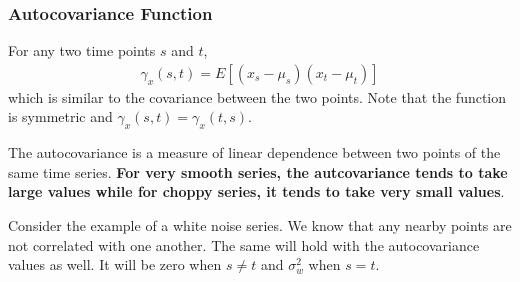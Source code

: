 \documentclass[../main.tex]{subfiles}
\begin{document}
    
    \subsubsection{Autocovariance Function}
    For any two time points $s$ and $t$,
    \begin{align*}
        \gamma_{x}(s, t) = E[(x_{s} - \mu_{s})(x_{t} - \mu_{t})]
    \end{align*}
    which is similar to the covariance between the two points. Note that the function is symmetric and $\gamma_{x}(s, t) = \gamma_{x}(t, s)$.\newline

    The autocovariance is a measure of linear dependence between two points of the same time series. \textbf{For very smooth series, the autcovariance tends to take large values while for choppy series, it tends to take very small values}.\newline

    Consider the example of a white noise series. We know that any nearby points are not correlated with one another. The same will hold with the autocovariance values as well. It will be zero when $s \neq t$ and $\sigma_{w}^{2}$ when $s = t$.\newline
\end{document}
